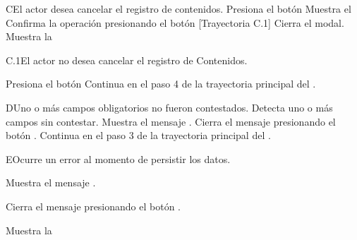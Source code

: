 
\begin{UCtrayectoriaA}{C}{El actor desea cancelar el registro de contenidos.}
    \UCpaso[\UCactor] Presiona el botón 
    \UCpaso Muestra el 
    \UCpaso[\UCactor] Confirma la operación presionando el botón  [Trayectoria C.1]
    \UCpaso Cierra el modal.
    \UCpaso Muestra la 
\end{UCtrayectoriaA}


\begin{UCtrayectoriaA}{C.1}{El actor no desea cancelar el registro de Contenidos.}

    \UCpaso[\UCactor] Presiona el botón 
    \UCpaso Continua en el paso 4 de la trayectoria principal del .

\end{UCtrayectoriaA}


\begin{UCtrayectoriaA}{D}{Uno o más campos obligatorios no fueron contestados.}
    \UCpaso Detecta uno o más campos sin contestar.
    \UCpaso Muestra el mensaje .
    \UCpaso[\UCactor] Cierra el mensaje presionando el botón .
    \UCpaso Continua en el paso 3 de la trayectoria principal del .
\end{UCtrayectoriaA}


\begin{UCtrayectoriaA}{E}{Ocurre un error al momento de persistir los datos.}
    \item Muestra el mensaje .  
    \item Cierra el mensaje presionando el botón .
    \item Muestra la 
\end{UCtrayectoriaA}